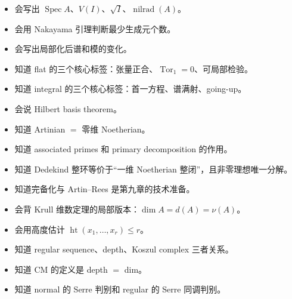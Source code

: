 \documentclass[a4paper]{ctexart}
\begin{document}
\begin{itemize}
  \item 会写出 \(\operatorname{Spec}A\)、\(V(I)\)、\(\sqrt I\)、\(\operatorname{nilrad}(A)\)。
  \item 会用 Nakayama 引理判断最少生成元个数。
  \item 会写出局部化后谱和模的变化。
  \item 知道 flat 的三个核心标签：张量正合、\(\operatorname{Tor}_1=0\)、可局部检验。
  \item 知道 integral 的三个核心标签：首一方程、谱满射、going-up。
  \item 会说 Hilbert basis theorem。
  \item 知道 Artinian \(=\) 零维 Noetherian。
  \item 知道 associated primes 和 primary decomposition 的作用。
  \item 知道 Dedekind 整环等价于“一维 Noetherian 整闭”，且非零理想唯一分解。
  \item 知道完备化与 Artin--Rees 是第九章的技术准备。
  \item 会背 Krull 维数定理的局部版本：\(\dim A=d(A)=\nu(A)\)。
  \item 会用高度估计 \(\operatorname{ht}(x_1,\dots,x_r)\le r\)。
  \item 知道 regular sequence、depth、Koszul complex 三者关系。
  \item 知道 CM 的定义是 depth \(=\) dim。
  \item 知道 normal 的 Serre 判别和 regular 的 Serre 同调判别。
\end{itemize}
\end{document}
